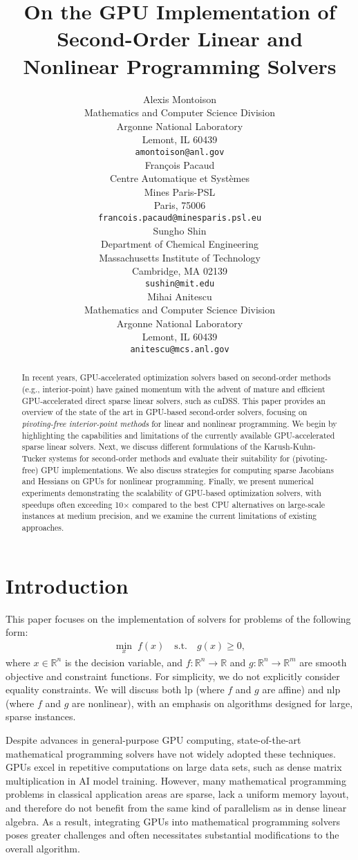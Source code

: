 \documentclass{article}
\title{On the GPU Implementation of Second-Order Linear and Nonlinear Programming Solvers}
\author{%
  Alexis Montoison\\
  Mathematics and Computer Science Division\\
  Argonne National Laboratory\\
  Lemont, IL 60439\\
  \texttt{amontoison@anl.gov}\\
  \And
  Fran\c{c}ois Pacaud\\
  Centre Automatique et Systèmes\\
  Mines Paris-PSL\\
  Paris, 75006 \\
  \texttt{francois.pacaud@minesparis.psl.eu}\\
  \And
  Sungho Shin\\
  Department of Chemical Engineering\\
  Massachusetts Institute of Technology\\
  Cambridge, MA 02139\\
  \texttt{sushin@mit.edu}\\
  \And
  Mihai Anitescu\\
  Mathematics and Computer Science Division\\
  Argonne National Laboratory\\
  Lemont, IL 60439\\
  \texttt{anitescu@mcs.anl.gov}\\
}
\begin{document}
\maketitle


\begin{abstract}
In recent years, GPU-accelerated optimization solvers based on second-order methods (e.g., interior-point) have gained momentum with the advent of mature and efficient GPU-accelerated direct sparse linear solvers, such as cuDSS.
This paper provides an overview of the state of the art in GPU-based second-order solvers, focusing on \emph{pivoting-free interior-point methods} for linear and nonlinear programming.
We begin by highlighting the capabilities and limitations of the currently available GPU-accelerated sparse linear solvers.
Next, we discuss different formulations of the Karush-Kuhn-Tucker systems for second-order methods and evaluate their suitability for (pivoting-free) GPU implementations.
We also discuss strategies for computing sparse Jacobians and Hessians on GPUs for nonlinear programming.
Finally, we present numerical experiments demonstrating the scalability of GPU-based optimization solvers, with speedups often exceeding 10× compared to the best CPU alternatives on large-scale instances at medium precision, and we examine the current limitations of existing approaches.
\end{abstract}

\section{Introduction}\label{eqn:intro}

This paper focuses on the implementation of solvers for problems of the following form:
\begin{align}\label{eqn:opt}
  \min_{x } \; f(x) \quad \text{s.t.} \quad g(x) \geq 0,
\end{align}
where \(x \in \mathbb{R}^n\) is the decision variable, and \(f: \mathbb{R}^n \to \mathbb{R}\) and \(g: \mathbb{R}^n \to \mathbb{R}^m\) are smooth objective and constraint functions. 
For simplicity, we do not explicitly consider equality constraints. 
We will discuss both \gls*{lp} (where \(f\) and \(g\) are affine) and \gls*{nlp} (where \(f\) and \(g\) are nonlinear), with an emphasis on algorithms designed for large, sparse instances.

Despite advances in general-purpose GPU computing, state-of-the-art mathematical programming solvers have not widely adopted these techniques. GPUs excel in repetitive computations on large data sets, such as dense matrix multiplication in AI model training. However, many mathematical programming problems in classical application areas are sparse, lack a uniform memory layout, and therefore do not benefit from the same kind of parallelism as in dense linear algebra. As a result, integrating GPUs into mathematical programming solvers poses greater challenges and often necessitates substantial modifications to the overall algorithm.
\end{document}
